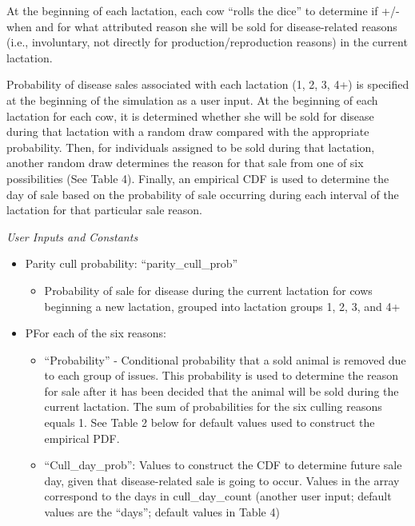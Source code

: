 \begin{refsection}
\begin{enumerate}
        At the beginning of each lactation, each cow “rolls the dice” to determine if +/- when and for what attributed reason she will be sold for disease-related reasons (i.e., involuntary, not directly for production/reproduction reasons) in the current lactation.   
        
        Probability of disease sales associated with each lactation (1, 2, 3, 4+) is specified at the beginning of the simulation as a user input. At the beginning of each lactation for each cow, it is determined whether she will be sold for disease during that lactation with a random draw compared with the appropriate probability. Then, for individuals assigned to be sold during that lactation, another random draw determines the reason for that sale from one of six possibilities (See Table 4). Finally, an empirical CDF is used to determine the day of sale based on the probability of sale occurring during each interval of the lactation for that particular sale reason. 


         \textit{User Inputs and Constants}
         \vspace{0.1cm}

         \begin{itemize}
             \item Parity cull probability: “parity\_cull\_prob” 
            \begin{itemize}
                \item Probability of sale for disease during the current lactation for cows beginning a new lactation, grouped into lactation groups 1, 2, 3, and 4+
            \end{itemize}
             \item PFor each of the six reasons:
            \begin{itemize}
                \item “Probability” - Conditional probability that a sold animal is removed due to each group of issues. This probability is used to determine the reason for sale after it has been decided that the animal will be sold during the current lactation. The sum of probabilities for the six culling reasons equals 1. See Table 2 below for default values used to construct the empirical PDF.
                \item “Cull\_day\_prob”: Values to construct the CDF to determine future sale day, given that disease-related sale is going to occur. Values in the array correspond to the days in cull\_day\_count (another user input; default values are the “days”; default values in Table 4) 
            \end{itemize}


\end{itemize}
\end{enumerate}
\end{refsection}
